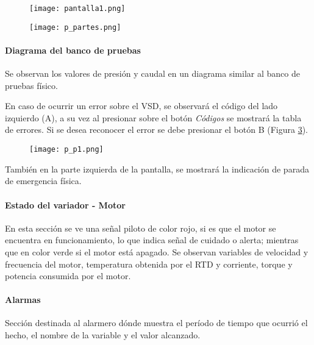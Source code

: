 \begin{figure}[h!]
	\centering
	\texttt{[image: pantalla1.png]}
	\label{fig:pantalla1}
\end{figure}
\begin{figure}[h!]
	\centering
	\texttt{[image: p\_partes.png]}
	\label{fig:partes}
\end{figure}

\paragraph{Diagrama del banco de pruebas}
Se observan los valores de presión y caudal en un diagrama similar al banco de pruebas físico.

En caso de ocurrir un error sobre el VSD, se observará el código del lado izquierdo (A), a su vez al presionar sobre el botón \textit{Códigos} se mostrará la tabla de errores. Si se desea reconocer el error se debe presionar el botón B (Figura \ref{fig:pp1}).
\begin{figure}[h!]
	\centering
	\texttt{[image: p\_p1.png]}
	\label{fig:pp1}
\end{figure}

También en la parte izquierda de la pantalla, se mostrará la indicación de parada de emergencia física.

\paragraph{Estado del variador - Motor}
En esta sección se ve una señal piloto de color rojo, si es que el motor se encuentra en funcionamiento, lo que indica señal de cuidado o alerta; mientras que en color verde si el motor está apagado. Se observan variables de velocidad y frecuencia del motor, temperatura obtenida por el RTD y corriente, torque y potencia consumida por el motor.
\paragraph{Alarmas}
Sección destinada al alarmero dónde muestra el período de tiempo que ocurrió el hecho, el nombre de la variable y el valor alcanzado.

